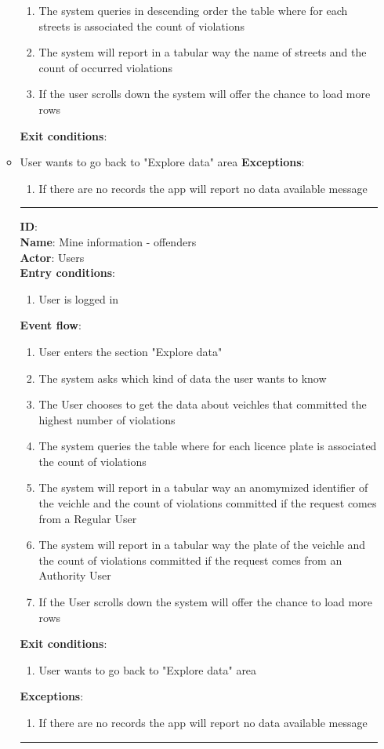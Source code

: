 \begin{enumerate}
\begin{itemize}
\begin{enumerate}
      \item{The system queries in descending order the table where for each streets is associated the count of violations }
      \item{The system will report in a tabular way the name of streets and the count of occurred violations}
      \item{If the user scrolls down the system will offer the chance to load more rows}
		\end{enumerate}
		\textbf{Exit conditions}:
          \item{User wants to go back to "Explore data" area}
		\textbf{Exceptions}:
    \begin{enumerate}
      \item{If there are no records the app will report no data available message}
    \end{enumerate}
		\rule{\linewidth}{0.4pt}
		\textbf{ID}:  \\
		\textbf{Name}: Mine information - offenders \\
		\textbf{Actor}: Users   \\
		\textbf{Entry conditions}:
		\begin{enumerate}
			\item{User is logged in}
		\end{enumerate}
		\textbf{Event flow}:
		\begin{enumerate}
			\item{User enters the section "Explore data"}
			\item{The system asks which kind of data the user wants to know}
      \item{The User chooses to get the data about veichles that committed the highest number of violations}
      \item{The system queries the table where for each licence plate is associated the count of violations }
      \item{The system will report in a tabular way an anomymized identifier of the veichle and the count of violations committed if the request comes from a Regular User}
      \item{The system will report in a tabular way the plate of the veichle and the count of violations committed if the request comes from an Authority User}
      \item{If the User scrolls down the system will offer the chance to load more rows}
		\end{enumerate}
		\textbf{Exit conditions}:
    \begin{enumerate}
      \item{User wants to go back to "Explore data" area}
    \end{enumerate}
		\textbf{Exceptions}:
		\begin{enumerate}
			\item{If there are no records the app will report no data available message}
		\end{enumerate}
		\rule{\linewidth}{0.4pt}




\end{itemize}
\end{enumerate}
